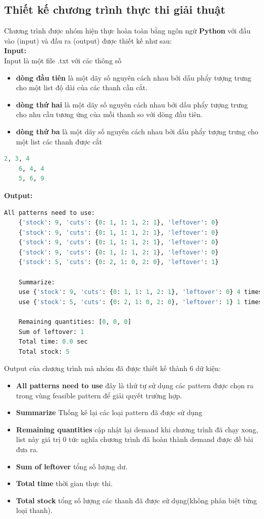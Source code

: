 \documentclass[a4paper]{article}
\begin{document}
\subsection{Thiết kế chương trình thực thi giải thuật}
\indent Chương trình được nhóm hiện thực hoàn toàn bằng ngôn ngữ \textbf{Python} với đầu vào (input) và đầu ra (output) được thiết kế như sau: \\
\indent\textbf{Input:} \\
\indent Input là một file .txt với các thông số 
\begin{itemize}
    \item \indent \textbf{dòng đầu tiên} là một dãy số nguyên cách nhau bởi dấu phẩy tượng trưng cho một list độ dài của các thanh cần cắt.
    \item \indent \textbf{dòng thứ hai} là một dãy số nguyên cách nhau bởi dấu phẩy tượng trưng cho nhu cầu tương ứng của mỗi thanh so với dòng đầu tiên.
    \item \indent \textbf{dòng thứ ba} là một dãy số nguyên cách nhau bởi dấu phẩy tượng trưng cho một list các thanh được cắt
\end{itemize}
\begin{lstlisting}[language=Python,caption={Input file}]
    2, 3, 4
    6, 4, 4
    5, 6, 9    
\end{lstlisting}
\indent\textbf{Output:} 
\begin{lstlisting}[language=Python,caption={Terminal Console}]
    All patterns need to use:
    {'stock': 9, 'cuts': {0: 1, 1: 1, 2: 1}, 'leftover': 0}
    {'stock': 9, 'cuts': {0: 1, 1: 1, 2: 1}, 'leftover': 0}
    {'stock': 9, 'cuts': {0: 1, 1: 1, 2: 1}, 'leftover': 0}
    {'stock': 9, 'cuts': {0: 1, 1: 1, 2: 1}, 'leftover': 0}
    {'stock': 5, 'cuts': {0: 2, 1: 0, 2: 0}, 'leftover': 1}
    
    Summarize:
    use {'stock': 9, 'cuts': {0: 1, 1: 1, 2: 1}, 'leftover': 0} 4 times
    use {'stock': 5, 'cuts': {0: 2, 1: 0, 2: 0}, 'leftover': 1} 1 times
    
    Remaining quantities: [0, 0, 0]
    Sum of leftover: 1
    Total time: 0.0 sec
    Total stock: 5
\end{lstlisting}
\indent Output của chương trình mà nhóm đã được thiết kế thành 6 dữ kiện:
\begin{itemize}
    \item \textbf{All patterns need to use} đây là thứ tự sử dụng các pattern được chọn ra trong vùng feasible pattern để giải quyết trường hợp.
    \item  \textbf{Summarize} Thống kê lại các loại pattern đã được sử dụng
    \item \textbf{Remaining quantities} cập nhật lại demand khi chương trình đã chạy xong, list này giá trị 0 tức nghĩa chương trình đã hoàn thành demand được đề bài đưa ra.
    \item \textbf{Sum of leftover} tổng số lượng dư. 
    \item \textbf{Total time} thời gian thực thi.
    \item \textbf{Total stock} tổng số lượng các thanh đã được sử dụng(không phân biệt từng loại thanh).
\end{itemize}
\end{document}
